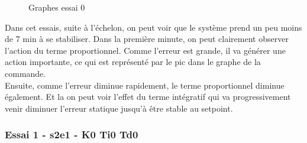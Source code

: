 \begin{figure}[H]
    \centering
    \caption{Graphes essai 0}
    \label{fig:essai-0}
\end{figure}

Dans cet essais, suite à l'échelon, on peut voir que le système prend un peu 
moins de 7 min à se stabiliser. Dans la première minute, on peut clairement
observer l'action du terme proportionnel. Comme l'erreur est grande, 
il va générer une action importante, ce qui est représenté par le pic
dans le graphe de la commande.\\

Ensuite, comme l'erreur diminue rapidement, le terme proportionnel diminue également.
Et la on peut voir l'effet du terme intégratif qui va progressivement venir
diminuer l'erreur statique jusqu'à être stable au setpoint.


\subsubsection{Essai 1 - s2e1 - K0 Ti0 Td0}

